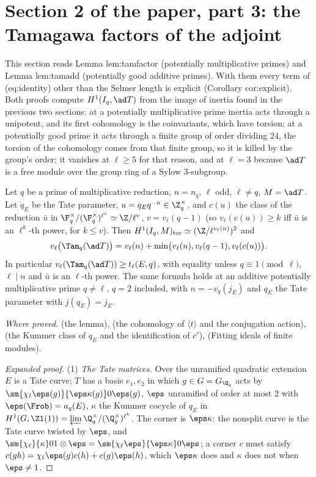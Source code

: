 \begin{sloppypar}
\section[Paper 2: Tamagawa factors]{Section 2 of the paper, part 3: the Tamagawa factors of the adjoint}\label{sec:paper:tamagawa}

This section reads Lemma lem:tamfactor (potentially multiplicative primes) and Lemma lem:tamadd (potentially good additive primes). With them every term
of (eq:identity) other than the Selmer length is explicit (Corollary cor:explicit). Both proofs compute $H^1(I_q,\ad T)$ from the image of inertia found in the previous two
sections: at a potentially multiplicative prime inertia acts through a unipotent, and its first cohomology is the coinvariants, which have torsion; at a potentially good prime it
acts through a finite group of order dividing $24$, the torsion of the cohomology comes from that finite group, so it is killed by the group's order; it vanishes at $\ell\ge5$ for that
reason, and at $\ell=3$ because $\ad T$ is a free module over the group ring of a Sylow $3$-subgroup.

\begin{lemma}\label{lem:paper:tamfactor}
Let $q$ be a prime of multiplicative reduction, $n=n_q$, $\ell$ odd, $\ell\ne q$, $M=\ad T$. Let $q_E$ be the Tate parameter, $u=q_Eq^{-n}\in\Z_q^\times$, and $c(u)$ the class of the
reduction $\bar u$ in $\F_q^\times/(\F_q^\times)^{\ell^v}\simeq\Z/\ell^v$, $v=v_\ell(q-1)$ (so $v_\ell(c(u))\ge k$ iff $\bar u$ is an $\ell^k$-th power, for $k\le v$). Then $H^1(I_q,M)_{\mathrm{tor}}\simeq(\Z/\ell^{v_\ell(n)})^2$ and
\[
v_\ell\bigl(\Tam_q(\ad T)\bigr)=v_\ell(n)+\min\bigl(v_\ell(n),v_\ell(q-1),v_\ell(c(u))\bigr).
\]
In particular $v_\ell(\Tam_q(\ad T))\ge t_\ell(E,q)$, with equality unless $q\equiv1\pmod\ell$, $\ell\mid n$ and $\bar u$ is an $\ell$-th power. The same formula holds at an additive potentially
multiplicative prime $q\ne\ell$, $q=2$ included, with $n=-v_q(j_E)$ and $q_E$ the Tate parameter with $j(q_E)=j_E$.
\end{lemma}

\noindent\emph{Where proved.}  (the lemma),  (the cohomology of $\langle t\rangle$ and the conjugation action),  (the
Kummer class of $q_E$ and the identification of $c'$),  (Fitting ideals of finite modules).

\begin{proof}[Expanded proof]
(1) \emph{The Tate matrices.} Over the unramified quadratic extension $E$ is a Tate curve; $T$ has a basis $e_1,e_2$ in which $g\in G=G_{\Q_q}$ acts by $\sm{\chi_\ell\eps(g)}{\eps\kappa(g)}0{\eps(g)}$,
$\eps$ unramified of order at most $2$ with $\eps(\Frob)=a_q(E)$, $\kappa$ the Kummer cocycle of $q_E$ in $H^1(G,\Zl(1))=\varprojlim\Q_q^\times/(\Q_q^\times)^{\ell^k}$. The corner is $\eps\kappa$: the
nonsplit curve is the Tate curve twisted by $\eps$, and $\sm{\chi_\ell}{\kappa}01\otimes\eps=\sm{\chi_\ell\eps}{\eps\kappa}0{\eps}$; a corner $c$ must satisfy $c(gh)=\chi_\ell\eps(g)c(h)+c(g)\eps(h)$, which
$\eps\kappa$ does and $\kappa$ does not when $\eps\ne1$.


\end{proof}
\end{sloppypar}
